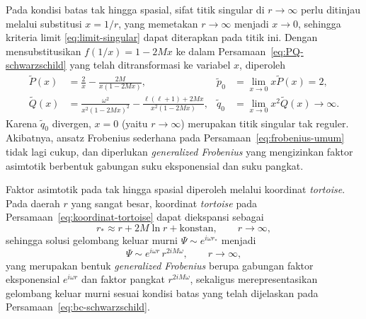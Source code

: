 Pada kondisi batas tak hingga spasial, sifat titik singular di $r \to \infty$ perlu ditinjau
melalui substitusi $x = 1/r$, yang memetakan $r \to \infty$ menjadi $x \to 0$, sehingga
kriteria limit \eqref{eq:limit-singular} dapat diterapkan pada titik ini. Dengan
mensubstitusikan $f(1/x) = 1 - 2Mx$ ke dalam Persamaan~\eqref{eq:PQ-schwarzschild} yang telah
ditransformasi ke variabel $x$, diperoleh
\begin{equation}
\begin{aligned}
    \tilde{P}(x) &= \frac{2}{x} - \frac{2M}{x(1-2Mx)},
    &\tilde{p}_0 &= \lim_{x\to0} x\tilde{P}(x) = 2, \\[4pt]
    \tilde{Q}(x) &= \frac{\omega^2}{x^2(1-2Mx)^2} - \frac{\ell(\ell+1)+2Mx}{x^2(1-2Mx)},
    &\tilde{q}_0 &= \lim_{x\to0} x^2\tilde{Q}(x) \to \infty.
\end{aligned}
\label{eq:transformasi-tak-hingga}
\end{equation}
Karena $\tilde{q}_0$ divergen, $x=0$ (yaitu $r\to\infty$) merupakan titik singular tak
reguler. Akibatnya, ansatz Frobenius sederhana pada
Persamaan~\eqref{eq:frobenius-umum} tidak lagi cukup, dan diperlukan \textit{generalized
Frobenius} yang mengizinkan faktor asimtotik berbentuk gabungan suku eksponensial dan suku
pangkat.

Faktor asimtotik pada tak hingga spasial diperoleh melalui koordinat \textit{tortoise}. Pada
daerah $r$ yang sangat besar, koordinat \textit{tortoise} pada
Persamaan~\eqref{eq:koordinat-tortoise} dapat diekspansi sebagai
\begin{equation}
    r_* \approx r + 2M \ln r + \text{konstan}, \qquad r \to \infty,
    \label{eq:ekspansi_tortoise_saf}
\end{equation}
sehingga solusi gelombang keluar murni $\Psi \sim e^{i\omega r_*}$ menjadi
\begin{equation}
    \Psi \sim e^{i\omega r}\, r^{2iM\omega}, \qquad r \to \infty,
    \label{eq:asimtotik_saf}
\end{equation}
yang merupakan bentuk \textit{generalized Frobenius} berupa gabungan faktor eksponensial
$e^{i\omega r}$ dan faktor pangkat $r^{2iM\omega}$, sekaligus merepresentasikan gelombang
keluar murni sesuai kondisi batas yang telah dijelaskan pada Persamaan~\eqref{eq:bc-schwarzschild}.

